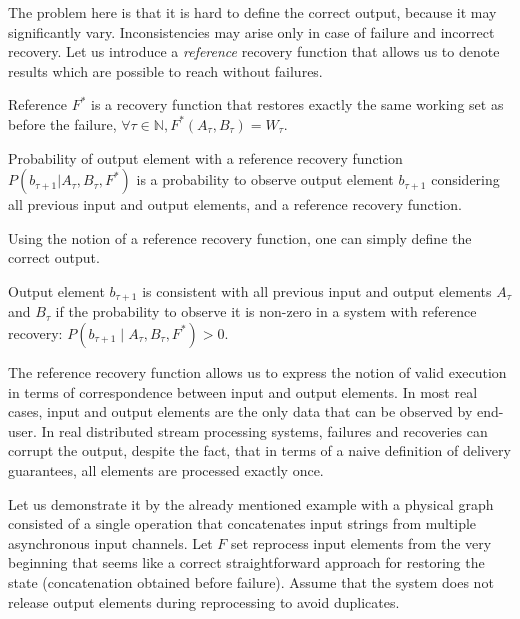 The problem here is that it is hard to define the correct output, because it may significantly vary. Inconsistencies may arise only in case of failure and incorrect recovery. Let us introduce a {\em reference} recovery function that allows us to denote results which are possible to reach without failures.

\begin{definition}{Reference}
$F^{*}$ is a recovery function that restores exactly the same working set as before the failure, $\forall \tau \in \mathbb{N}, F^{*}(A_\tau,B_\tau)=W_\tau$.
\end{definition}

\begin{definition}{Probability of output element with a reference recovery function}
$P(b_{\tau+1}|A_{\tau}, B_\tau, F^{*})$ is a probability to observe output element $b_{\tau+1}$ considering all previous input and output elements, and a reference recovery function.
\end{definition}

Using the notion of a reference recovery function, one can simply define the correct output. 

\begin{definition}{Output element $b_{\tau+1}$ is consistent}
with all previous input and output elements $A_\tau$ and $B_\tau$ if the probability to observe it is non-zero in a system with reference recovery: $P(b_{\tau+1} \mid A_\tau,B_\tau,F^{*})>0$.
\end{definition}

The reference recovery function allows us to express the notion of valid execution in terms of correspondence between input and output elements. In most real cases, input and output elements are the only data that can be observed by end-user. In real distributed stream processing systems, failures and recoveries can corrupt the output, despite the fact, that in terms of a naive definition of delivery guarantees, all elements are processed exactly once. 

Let us demonstrate it by the already mentioned example with a physical graph consisted of a single operation that concatenates input strings from multiple asynchronous input channels. Let $F$ set reprocess input elements from the very beginning that seems like a correct straightforward approach for restoring the state (concatenation obtained before failure). Assume that the system does not release output elements during reprocessing to avoid duplicates. 

